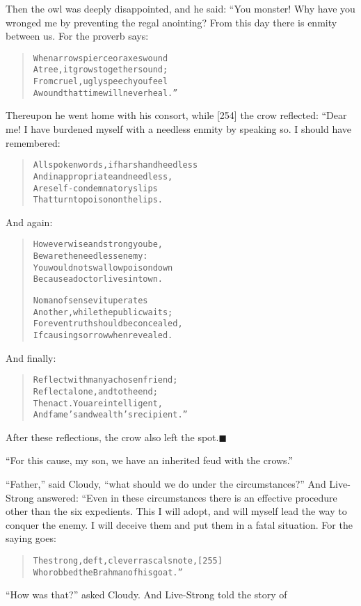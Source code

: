 \documentclass[article, twoside, 14pt]{memoir}
\newcommand{\qed}{\hfill \ensuremath{\blacksquare}}
\renewenvironment{verbatim}{%
\begin{quote}%
\vskip -10pt%
\begin{alltt}\normalfont\large}{\end{alltt}%
\end{quote}%
\vskip -10pt
} %
\begin{document}
Then the owl was deeply disappointed, and he said: “You monster!
Why have you wronged me by preventing the regal anointing? From
this day there is enmity between us. For the proverb says:

\begin{verbatim}
When arrows pierce or axes wound
A tree, it grows together sound;
From cruel, ugly speech you feel
A wound that time will never heal.”
\end{verbatim}
Thereupon he went home with his consort, while [254] the crow
reflected: “Dear me! I have burdened myself with a needless enmity
by speaking so. I should have remembered:

\begin{verbatim}
All spoken words, if harsh and heedless
And inappropriate and needless,
Are self-condemnatory slips
That turn to poison on the lips.
\end{verbatim}
And again:

\begin{verbatim}
However wise and strong you be,
Beware the needless enemy:
You would not swallow poison down
Because a doctor lives in town.

No man of sense vituperates
Another, while the public waits;
For even truth should be concealed,
If causing sorrow when revealed.
\end{verbatim}
And finally:

\begin{verbatim}
Reflect with many a chosen friend;
Reflect alone, and to the end;
Then act. You are intelligent,
And fame's and wealth's recipient.”
\end{verbatim}
After these reflections, the crow also left the
spot.\hyperref[s48]{\qed}

``For this cause, my son, we have an inherited feud with the crows.''

``Father,'' said Cloudy,
``what should we do under the circumstances?'' And Live-Strong
answered: “Even in these circumstances there is an effective
procedure other than the six expedients. This I will adopt, and
will myself lead the way to conquer the enemy. I will deceive them
and put them in a fatal situation. For the saying goes:

\begin{verbatim}
The strong, deft, clever rascals note,                  [255]
Who robbed the Brahman of his goat.”
\end{verbatim}
``How was that?'' asked Cloudy. And Live-Strong told the story of
\end{document}
